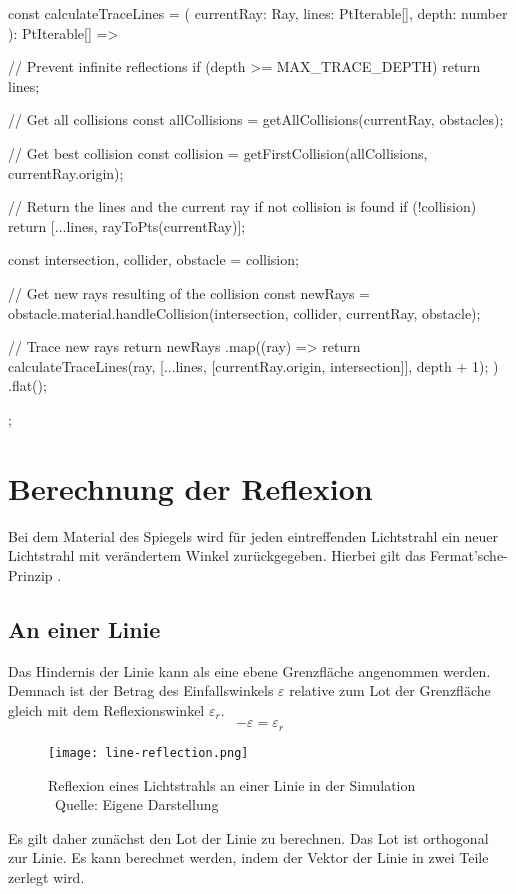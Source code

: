 \begin{verbnobox}[\scriptsize\mbox{}]
const calculateTraceLines = (
    currentRay: Ray,
    lines: PtIterable[],
    depth: number
): PtIterable[] => {
    // Prevent infinite reflections
    if (depth >= MAX_TRACE_DEPTH) return lines;

    // Get all collisions
    const allCollisions = getAllCollisions(currentRay, obstacles);

    // Get best collision
    const collision = getFirstCollision(allCollisions, currentRay.origin);

    // Return the lines and the current ray if not collision is found
    if (!collision) return [...lines, rayToPts(currentRay)];

    const { intersection, collider, obstacle } = collision;

    // Get new rays resulting of the collision
    const newRays = obstacle.material.handleCollision(intersection, collider, currentRay, obstacle);

    // Trace new rays
    return newRays
        .map((ray) => {
            return calculateTraceLines(ray, [...lines, [currentRay.origin, intersection]], depth + 1);
        })
        .flat();
    };
\end{verbnobox}

\section{Berechnung der Reflexion}
Bei dem Material des Spiegels wird für jeden eintreffenden Lichtstrahl ein neuer Lichtstrahl mit verändertem Winkel zurückgegeben. 
Hierbei gilt das Fermat’sche-Prinzip \parencite[vgl.][S. 20]{hering2017optik}.


\subsection*{An einer Linie}
Das Hindernis der Linie kann als eine ebene Grenzfläche angenommen werden. 
Demnach ist der Betrag des Einfallswinkels $ \varepsilon $ relative zum Lot der Grenzfläche gleich mit dem Reflexionswinkel $ \varepsilon_r $. 
\begin{equation}
    -\varepsilon = \varepsilon_r
\end{equation}
\begin{figure}
    \centering
    \texttt{[image: line-reflection.png]}

    \caption{Reflexion eines Lichtstrahls an einer Linie in der Simulation  \\ Quelle: Eigene Darstellung}

\end{figure}
Es gilt daher zunächst den Lot der Linie zu berechnen. Das Lot ist orthogonal zur Linie. 
Es kann berechnet werden, indem der Vektor der Linie in zwei Teile zerlegt wird. \parencite[vgl.][S. 1]{greve2006raytracing}

